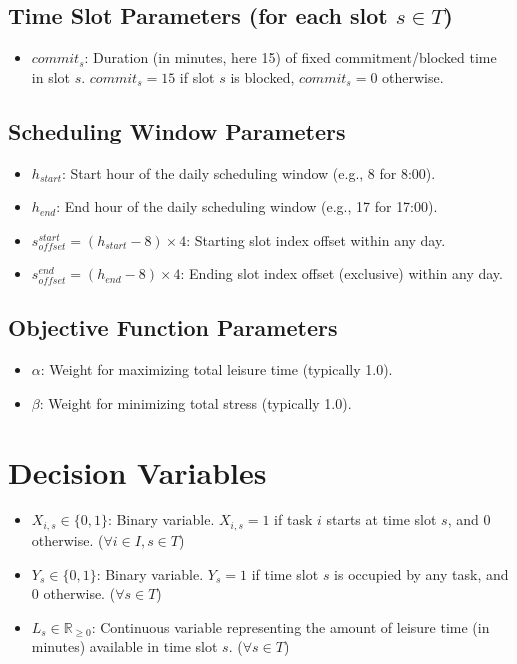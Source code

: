\documentclass{article}
\begin{document}
\subsection{Time Slot Parameters (for each slot $s \in T$)}
\begin{itemize}
    \item $commit_s$: Duration (in minutes, here 15) of fixed commitment/blocked time in slot $s$. $commit_s = 15$ if slot $s$ is blocked, $commit_s = 0$ otherwise.
\end{itemize}

\subsection{Scheduling Window Parameters}
\begin{itemize}
    \item $h_{start}$: Start hour of the daily scheduling window (e.g., 8 for 8:00).
    \item $h_{end}$: End hour of the daily scheduling window (e.g., 17 for 17:00).
    \item $s_{offset}^{start} = (h_{start} - 8) \times 4$: Starting slot index offset within any day.
    \item $s_{offset}^{end} = (h_{end} - 8) \times 4$: Ending slot index offset (exclusive) within any day.
\end{itemize}

\subsection{Objective Function Parameters}
\begin{itemize}
    \item $\alpha$: Weight for maximizing total leisure time (typically 1.0).
    \item $\beta$: Weight for minimizing total stress (typically 1.0).
\end{itemize}

\section{Decision Variables}
\begin{itemize}
    \item $X_{i,s} \in \{0, 1\}$: Binary variable. $X_{i,s} = 1$ if task $i$ starts at time slot $s$, and $0$ otherwise. ($\forall i \in I, s \in T$)
    \item $Y_s \in \{0, 1\}$: Binary variable. $Y_s = 1$ if time slot $s$ is occupied by any task, and $0$ otherwise. ($\forall s \in T$)
    \item $L_s \in \mathbb{R}_{\ge 0}$: Continuous variable representing the amount of leisure time (in minutes) available in time slot $s$. ($\forall s \in T$)
\end{itemize}
\end{document}
